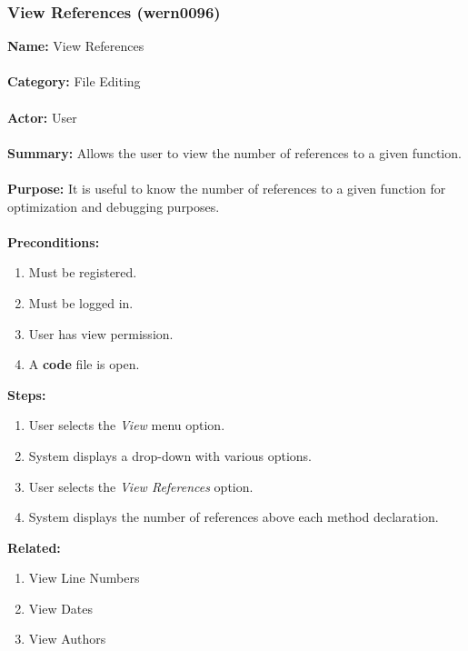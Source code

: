 \documentclass[11pt]{report}
\begin{document}
\subsubsection{View References (wern0096)}
\begin{framed}
	\noindent\textbf{Name:} View References \\ \\
	\textbf{Category:} File Editing \\ \\
	\textbf{Actor:} User \\ \\
	\textbf{Summary:} Allows the user to view the number of references to a given function. \\ \\
	\textbf{Purpose:} It is useful to know the number of references to a given function for optimization and debugging purposes. \\ \\
	\textbf{Preconditions:} 
	\begin{enumerate}
		\item Must be registered.
		\item Must be logged in.
		\item User has view permission.
		\item A \textbf{code} file is open.
	\end{enumerate}
	\textbf{Steps:}
	\begin{enumerate}
		\item User selects the \textit{View} menu option.
		\item System displays a drop-down with various options.
		\item User selects the \textit{View References} option.
		\item System displays the number of references above each method declaration.
	\end{enumerate}
	\textbf{Related:}
	\begin{enumerate}
		\item View Line Numbers
		\item View Dates
		\item View Authors
	\end{enumerate}
\end{framed}

\newpage
\end{document}
